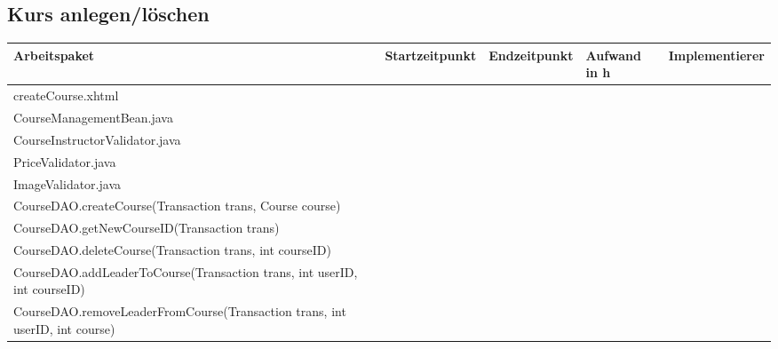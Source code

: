 \begin{landscape}
	
	
	\subsection{Kurs anlegen/löschen}
	\begin{tabular}{|p{10cm}|p{4cm}|p{3cm}|p{3cm}|p{3cm}|}
		\hline  \textbf{Arbeitspaket} & \textbf{Startzeitpunkt} & \textbf{Endzeitpunkt} & \textbf{Aufwand in h} & \textbf{Implementierer} \\ 
		\hline   createCourse.xhtml                                    &                            &                             &                     &\\
		\hline   CourseManagementBean.java                             &                            &                             &                     &\\
		\hline   CourseInstructorValidator.java                        &                            &                             &                     &\\
		\hline   PriceValidator.java                             &                            &                             &                     &\\
		\hline   ImageValidator.java                             &                            &                             &                     &\\
		\hline   CourseDAO.createCourse(Transaction trans, Course course)    &                            &                             &                     &\\
		\hline   CourseDAO.getNewCourseID(Transaction trans)                 &                            &                             &                     &\\
		\hline   CourseDAO.deleteCourse(Transaction trans, int courseID)     &                            &                             &                     &\\
		\hline   CourseDAO.addLeaderToCourse(Transaction trans, int userID, int courseID)    &                            &                             &                     &\\
		\hline   CourseDAO.removeLeaderFromCourse(Transaction trans, int userID, int course) &                            &                             &                     &\\
		\hline 
	\end{tabular} \ \\
	\ \\
	

\end{landscape}
